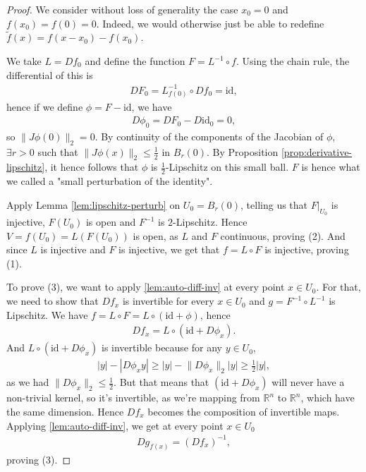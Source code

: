 \begin{proof}
	We consider without loss of generality the case $x_{0} = 0$ and $f(x_{0}) = f(0) = 0$. Indeed, we would otherwise just be able to redefine $\tilde{f}(x) = f(x - x_{0}) - f(x_{0})$.

	We take $L = Df_{0}$ and define the function $F = L^{-1} \circ f$. Using the chain rule, the differential of this is
	\begin{align*}
		DF_{0} = L^{-1}_{f(0)} \circ Df_{0} = \text{id},
	\end{align*}
	hence if we define $\phi = F - \text{id}$, we have
	\begin{align*}
		D\phi_{0} = DF_{0} - D \text{id}_{0} = 0,
	\end{align*}
	so $\lVert J\phi(0) \rVert_{2} = 0$. By continuity of the components of the Jacobian of $\phi$, $\exists r > 0$ such that $\lVert  J\phi(x) \rVert_{2} \leq \frac{1}{2}$ in $B_{r}(0)$. By Proposition \ref{prop:derivative-lipschitz}, it hence follows that $\phi$ is $\frac{1}{2}$-Lipschitz on this small ball. $F$ is hence what we called a "small perturbation of the identity".

	Apply Lemma \ref{lem:lipschitz-perturb} on $U_{0} = B_{r}(0)$, telling us that $F |_{U_{0}}$ is injective, $F(U_{0})$ is open and $F^{-1}$ is $2$-Lipschitz. Hence $V = f(U_{0}) = L(F(U_{0}))$ is open, as $L$ and $F$ continuous, proving (2). And since $L$ is injective and $F$ is injective, we get that $f = L \circ F$ is injective, proving (1).

	To prove (3), we want to apply \ref{lem:auto-diff-inv} at every point $x \in U_{0}$. For that, we need to show that $Df_{x}$ is invertible for every $x \in U_{0}$ and $g=F^{-1} \circ L^{-1}$ is Lipschitz. We have $f = L \circ F = L \circ (\text{id} + \phi)$, hence
	\begin{align*}
		Df_{x} = L \circ (\text{id} + D\phi_{x}).
	\end{align*}
	And $L \circ (\text{id} + D\phi_{x})$ is invertible because for any $y \in U_{0}$,
	\begin{align*}
		\left| y \right| - \left| D\phi_{x}y \right| \geq \left| y \right| - \lVert D \phi_{x} \rVert_{2} \left| y \right| \geq \frac{1}{2} \left| y \right|,
	\end{align*}
	as we had $\lVert D \phi_{x} \rVert_{2} \leq \frac{1}{2}$. But that means that $(\text{id} + D\phi_{x})$ will never have a non-trivial kernel, so it's invertible, as we're mapping from $\mathbb{R}^{n}$ to $\mathbb{R}^{n}$, which have the same dimension. Hence $Df_{x}$ becomes the composition of invertible maps. Applying \ref{lem:auto-diff-inv}, we get at every point $x \in U_{0}$
	\begin{align*}
		Dg_{f(x)} = (Df_{x})^{-1},
	\end{align*}
	proving (3).


\end{proof}
